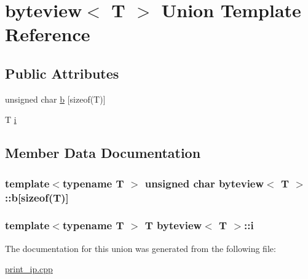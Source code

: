 \hypertarget{unionbyteview}{}\section{byteview$<$ T $>$ Union Template Reference}
\label{unionbyteview}
\subsection*{Public Attributes}
\begin{DoxyCompactItemize}
\item 
unsigned char \hyperlink{unionbyteview_af86288b3e2724623c6a8836c07b26d28}{b} \mbox{[}sizeof(T)\mbox{]}
\item 
T \hyperlink{unionbyteview_a34c79afd8afd71191848bd8fa06fd286}{i}
\end{DoxyCompactItemize}


\subsection{Member Data Documentation}
\subsubsection[{\texorpdfstring{b}{b}}]{\setlength{\rightskip}{0pt plus 5cm}template$<$typename T $>$ unsigned char {\bf byteview}$<$ T $>$\+::b\mbox{[}sizeof(T)\mbox{]}}\hypertarget{unionbyteview_af86288b3e2724623c6a8836c07b26d28}{}\label{unionbyteview_af86288b3e2724623c6a8836c07b26d28}
\subsubsection[{\texorpdfstring{i}{i}}]{\setlength{\rightskip}{0pt plus 5cm}template$<$typename T $>$ T {\bf byteview}$<$ T $>$\+::i}\hypertarget{unionbyteview_a34c79afd8afd71191848bd8fa06fd286}{}\label{unionbyteview_a34c79afd8afd71191848bd8fa06fd286}


The documentation for this union was generated from the following file\+:\begin{DoxyCompactItemize}
\item 
\hyperlink{print__ip_8cpp}{print\+\_\+ip.\+cpp}\end{DoxyCompactItemize}

